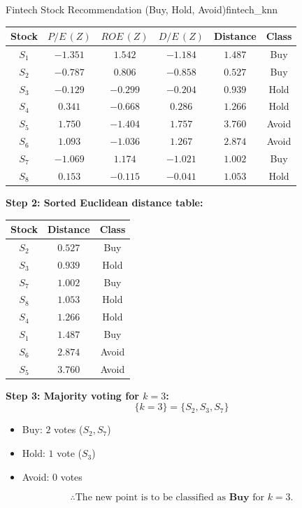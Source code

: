 \begin{example}{Fintech Stock Recommendation (Buy, Hold, Avoid)}{fintech_knn}
\begin{center}
\begin{tabular}{cccccc}
\toprule
\textbf{Stock} & $P/E\,(Z)$ & $ROE\,(Z)$ & $D/E\,(Z)$ & \textbf{Distance} & \textbf{Class} \\
\midrule
$S_1$ & $-1.351$ & $1.542$ & $-1.184$ & $1.487$ & Buy \\
$S_2$ & $-0.787$ & $0.806$ & $-0.858$ & $0.527$ & Buy \\
$S_3$ & $-0.129$ & $-0.299$ & $-0.204$ & $0.939$ & Hold \\
$S_4$ & $0.341$ & $-0.668$ & $0.286$ & $1.266$ & Hold \\
$S_5$ & $1.750$ & $-1.404$ & $1.757$ & $3.760$ & Avoid \\
$S_6$ & $1.093$ & $-1.036$ & $1.267$ & $2.874$ & Avoid \\
$S_7$ & $-1.069$ & $1.174$ & $-1.021$ & $1.002$ & Buy \\
$S_8$ & $0.153$ & $-0.115$ & $-0.041$ & $1.053$ & Hold \\
\bottomrule
\end{tabular}
\end{center}

\noindent\textbf{Step 2: Sorted Euclidean distance table:}
\begin{center}
\begin{tabular}{ccc}
\toprule
\textbf{Stock} & \textbf{Distance} & \textbf{Class} \\
\midrule
$S_2$ & $0.527$ & Buy \\
$S_3$ & $0.939$ & Hold \\
$S_7$ & $1.002$ & Buy \\
$S_8$ & $1.053$ & Hold \\
$S_4$ & $1.266$ & Hold \\
$S_1$ & $1.487$ & Buy \\
$S_6$ & $2.874$ & Avoid \\
$S_5$ & $3.760$ & Avoid \\
\bottomrule
\end{tabular}
\end{center}

\noindent\textbf{Step 3: Majority voting for $k = 3$:}
$$\{k = 3\} = \{S_2, S_3, S_7\}$$
\begin{itemize}[leftmargin=1.5em]
    \item Buy: $2$ votes ($S_2, S_7$)
    \item Hold: $1$ vote ($S_3$)
    \item Avoid: $0$ votes
\end{itemize}
$$\therefore \text{The new point is to be classified as } \textbf{Buy} \text{ for } k = 3.$$
\end{example}


